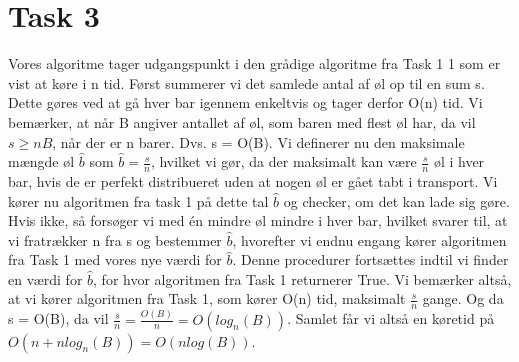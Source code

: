 \section{Task 3}
Vores algoritme tager udgangspunkt i den grådige algoritme fra Task 1 1 som er vist at køre i n tid.
Først summerer vi det samlede antal af øl op til en sum s. Dette gøres ved at gå hver bar igennem enkeltvis og tager derfor O(n) tid.
Vi bemærker, at når B angiver antallet af øl, som baren med flest øl har, da vil $s \geq nB$, når der er n barer.
Dvs. s = O(B).
Vi definerer nu den maksimale mængde øl $\hat{b}$ som $\hat{b} = \frac{s}{n}$, hvilket vi gør, da der maksimalt kan være $\frac{s}{n}$ øl i hver bar, hvis de er perfekt distribueret uden at nogen øl er gået tabt i transport. Vi kører nu algoritmen fra task 1 på dette tal $\hat{b}$ og checker, om det kan lade sig gøre. Hvis ikke, så forsøger vi med én mindre øl mindre i hver bar, hvilket svarer til, at vi fratrækker n fra s og bestemmer $\hat{b}$, hvorefter vi endnu engang kører algoritmen fra Task 1 med vores nye værdi for $\hat{b}$. Denne procedurer fortsættes indtil vi finder en værdi for $\hat{b}$, for hvor algoritmen fra Task 1 returnerer True.
Vi bemærker altså, at vi kører algoritmen fra Task 1, som kører O(n) tid, maksimalt $\frac{s}{n}$ gange. Og da s = O(B), da vil $\frac{s}{n} = \frac{O(B)}{n} = O(log_n(B))$.
Samlet får vi altså en køretid på $O(n + nlog_n(B)) = O(nlog(B))$.
